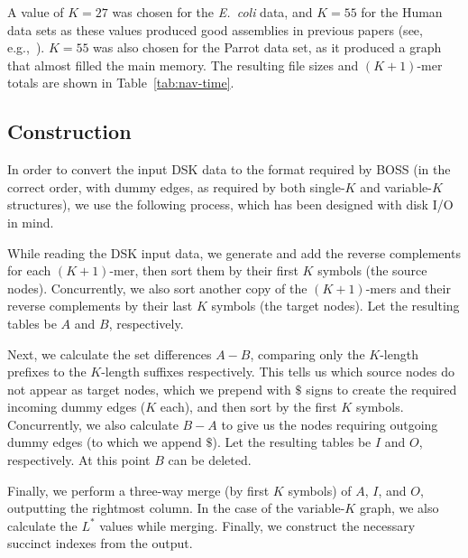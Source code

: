 A value of $K = 27$ was chosen
for the {\em E.~coli} data, and $K = 55$
for the Human data sets as these values produced good assemblies in previous papers (see, e.g.,~\cite{paul}). $K = 55$ was also chosen for the Parrot
data set, %
as it produced a graph that almost filled the main memory.
The resulting file sizes and $(K+1)$-mer totals are shown in Table~\ref{tab:nav-time}.



\subsection{Construction}
\label{sec:construction}

In order to convert the input DSK data to the format required by BOSS (in the correct order, with dummy edges, as required by both single-$K$ and variable-$K$ structures),
we use the following process, which has been designed with disk I/O in mind.

While reading the DSK input data, we generate and add the reverse complements for each $(K+1)$-mer, then sort them by their first $K$ symbols (the source nodes). Concurrently, we also sort another copy of the $(K+1)$-mers and their reverse complements by their last $K$ symbols (the target nodes). Let the resulting tables
be $A$ and $B$, respectively.

Next, we calculate the set differences $A-B$, comparing only the $K$-length prefixes to the $K$-length suffixes respectively. This tells us which source nodes do not
appear as target nodes, which we prepend with $\$$ signs to create the required incoming dummy edges ($K$ each), and then sort by the first $K$ symbols. Concurrently, we also calculate $B-A$ to give us
the nodes requiring outgoing dummy edges (to which we append $\$$). Let the resulting tables be $I$ and $O$, respectively. At this point $B$ can be deleted.

Finally, we perform a three-way merge (by first $K$ symbols) of $A$, $I$, and $O$, outputting the rightmost column. In the case of the variable-$K$ graph,
we also calculate the $L^{*}$ values while merging. Finally, we construct the necessary succinct indexes from the output.

